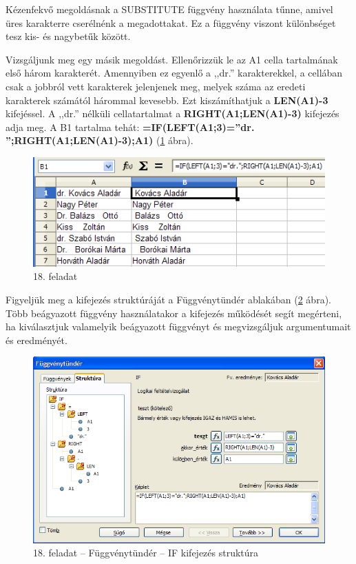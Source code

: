 Kézenfekvő megoldásnak a SUBSTITUTE függvény használata
tűnne, amivel üres karakterre cserélnénk a megadottakat. Ez a
függvény viszont különbséget tesz kis- és nagybetűk
között.

Vizsgáljunk meg egy másik megoldást. Ellenőrizzük le az A1
cella tartalmának első három karakterét. Amennyiben ez
egyenlő a ,,dr.'' karakterekkel, a
cellában csak a jobbról vett karakterek jelenjenek meg, melyek
száma az eredeti karakterek számától hárommal kevesebb. Ezt
kiszámíthatjuk a \textsf{\textbf{LEN(A1)-3}} kifejéssel. A
,,dr.'' nélküli cellatartalmat a
\textsf{\textbf{RIGHT(A1;LEN(A1)-3)}} kifejezés adja meg. A B1
tartalma tehát:
\textsf{\textbf{=IF(LEFT(A1;3)=''dr. '';RIGHT(A1;LEN(A1)-3);A1)}}
(\ref{18-feladat} ábra).

\begin{figure}[!h]
\begin{center}
\includegraphics[width=11.354cm]{oocalcv1-img90.png}
\caption{18. feladat}\label{18-feladat}
\end{center}
\end{figure}

Figyeljük meg a kifejezés struktúráját a
Függvénytündér ablakában (\ref{18-feladatIF} ábra). Több beágyazott
függvény használatakor a kifejezés működését segít
megérteni, ha kiválasztjuk valamelyik beágyazott függvényt
és megvizsgáljuk argumentumait és eredményét.

\begin{figure}[!h]
\begin{center}
\includegraphics[width=15.999cm]{oocalcv1-img91.png}
\caption{18. feladat --  Függvénytündér -- IF kifejezés struktúra}\label{18-feladatIF}
\end{center}
\end{figure}

